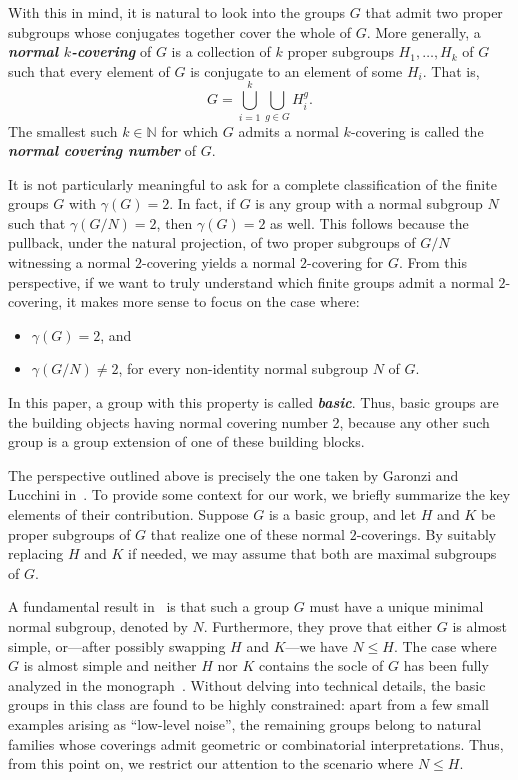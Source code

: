 \documentclass{amsart}
\begin{document}
With this in mind, it is natural to look into the groups $G$ that admit two proper subgroups whose conjugates together cover the whole of $G$. More generally, a \textit{\textbf{normal $k$-covering}} of $G$ is a collection of $k$ proper subgroups $H_1, \ldots, H_k$ of $G$ such that every element of $G$ is conjugate to an element of some $H_i$. That is,
$$G = \bigcup_{i=1}^k \bigcup_{g \in G} H_i^g.$$
The smallest such $k \in \mathbb{N}$ for which $G$ admits a normal $k$-covering is called the \textit{\textbf{normal covering number}} of $G$.

It is not particularly meaningful to ask for a complete classification of the finite groups $G$ with $\gamma(G) = 2$. In fact, if $G$ is any group with a normal subgroup $N$ such that $\gamma(G/N) = 2$, then $\gamma(G) = 2$ as well. This follows because the pullback, under the natural projection, of  two proper subgroups of $G/N$ witnessing a normal $2$-covering yields a normal $2$-covering for $G$. From this perspective, if we want to truly understand which finite groups admit a normal $2$-covering, it makes more sense to focus on the case where:
\begin{itemize}
\item $\gamma(G) = 2$, and
\item $\gamma(G/N) \ne 2$, for every non-identity normal subgroup $N$ of $G$.
\end{itemize}
In this paper, a group with this property is called \textit{\textbf{basic}}. Thus, basic
groups are the building objects having normal covering number 2, because any other such group is a group extension of one of these building blocks.

The perspective outlined above is precisely the one taken by Garonzi and Lucchini in~\cite{GL}. To provide some context for our work, we briefly summarize the key elements of their contribution. Suppose $G$ is a basic group, and let $H$ and $K$ be proper subgroups of $G$ that realize one of these normal $2$-coverings. By suitably replacing $H$ and $K$ if needed, we may assume that both are maximal subgroups of $G$.

A fundamental result in~\cite{GL} is that such a group $G$ must have a unique minimal normal subgroup, denoted by $N$. Furthermore, they prove that either $G$ is almost simple, or—after possibly swapping $H$ and $K$—we have $N \le H$. The case where $G$ is almost simple and neither $H$ nor $K$ contains the socle of $G$ has been fully analyzed in the monograph~\cite{libro}. Without delving into technical details, the basic groups in this class are found to be highly constrained: apart from a few small examples arising as ``low-level noise'', the remaining groups belong to natural families whose coverings admit geometric or combinatorial interpretations.
 Thus, from this point on, we restrict our attention to the scenario where $N \le H$.
\end{document}
